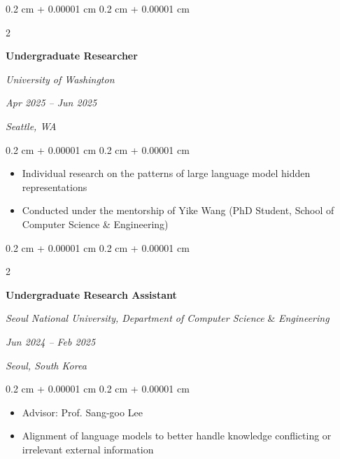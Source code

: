 \documentclass[10pt, letterpaper]{article}
\newenvironment{highlights}{
    \begin{itemize}[
        topsep=0.10 cm,
        parsep=0.10 cm,
        partopsep=0pt,
        itemsep=0pt,
        leftmargin=0.4 cm + 10pt
    ]
}{
    \end{itemize}
} %
\newenvironment{onecolentry}{
    \begin{adjustwidth}{
        0.2 cm + 0.00001 cm
    }{
        0.2 cm + 0.00001 cm
    }
}{
    \end{adjustwidth}
} %
\newenvironment{twocolentry}[2][]{
    \onecolentry
    \def\secondColumn{#2}
    \setcolumnwidth{\fill, 4.5 cm}
    \begin{paracol}{2}
}{
    \switchcolumn \raggedleft \secondColumn
    \end{paracol}
    \endonecolentry
} %
\begin{document}
        \vspace{0.3 cm}

        \begin{twocolentry}{
        \textit{Apr 2025 – Jun 2025}
        
        \textit{Seattle, WA}}
            \textbf{Undergraduate Researcher}

            \textit{University of Washington}
        \end{twocolentry}

        \vspace{0.10 cm}
        \begin{onecolentry}
            \begin{highlights}
                \item Individual research on the patterns of large language model hidden representations
                \item Conducted under the mentorship of Yike Wang (PhD Student, School of Computer Science \& Engineering)
            \end{highlights}
        \end{onecolentry}

        \vspace{0.3 cm}

        \break

            \begin{twocolentry}{
            \textit{Jun 2024 – Feb 2025}
            
            \textit{Seoul, South Korea}}
                \textbf{Undergraduate Research Assistant}

                \textit{Seoul National University,  Department of Computer Science} \& \textit{Engineering}
            \end{twocolentry}

            \vspace{0.10 cm}
            \begin{onecolentry}
                \begin{highlights}
                    \item Advisor: Prof. Sang-goo Lee
                    \item Alignment of language models to better handle knowledge conflicting or irrelevant external information
                \end{highlights}
            \end{onecolentry}
\end{document}
